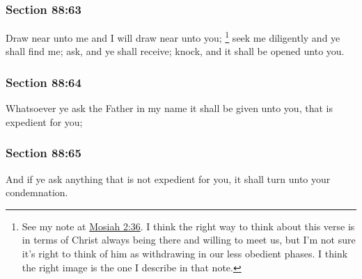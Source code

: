 	\subsubsection{Section 88:63} %
		\label{DC88-63}

		Draw near unto me and I will draw near unto you;%
			\footnote{%
				\label{DC88-63-NOTE-draw}%
				See my note at \hyperref[MOSIAH-2-36]{Mosiah 2:36}. I think the right way to think about this verse is in terms of Christ always being there and willing to meet us, but I'm not sure it's right to think of him as withdrawing in our less obedient phases. I think the right image is the one I describe in that note.
				}
		seek me diligently and ye shall find me; ask, and ye shall receive; knock, and it shall be opened unto you.


	\subsubsection{Section 88:64} %
		\label{DC88-64}

		Whatsoever ye ask the Father in my name it shall be given unto you, that is expedient for you;


	\subsubsection{Section 88:65} %
		\label{DC88-65}

		And if ye ask anything that is not expedient for you, it shall turn unto your condemnation.

